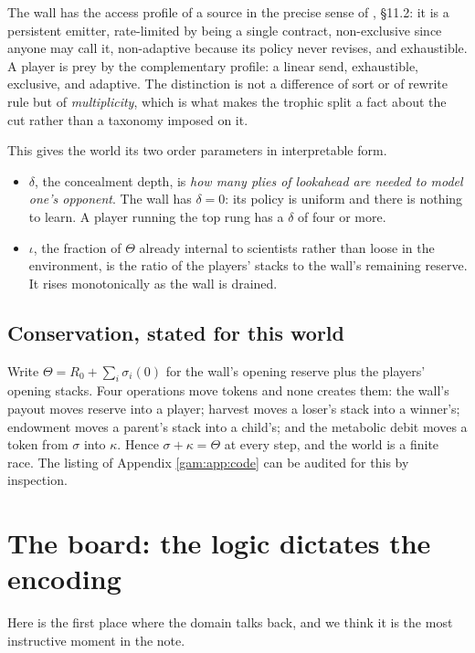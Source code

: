The wall has the access profile of a source in the precise sense of
\chSci, \S11.2: it is a persistent emitter, rate-limited by being a
single contract, non-exclusive since anyone may call it, non-adaptive because
its policy never revises, and exhaustible. A player is prey by the complementary
profile: a linear send, exhaustible, exclusive, and adaptive. The distinction is
not a difference of sort or of rewrite rule but of \emph{multiplicity}, which is
what makes the trophic split a fact about the cut rather than a taxonomy imposed
on it.

This gives the world its two order parameters in interpretable form.
\begin{itemize}
\item $\delta$, the concealment depth, is \emph{how many plies of lookahead are
needed to model one's opponent}. The wall has $\delta = 0$: its policy is
uniform and there is nothing to learn. A player running the top rung has a
$\delta$ of four or more.
\item $\iota$, the fraction of $\Theta$ already internal to scientists rather
than loose in the environment, is the ratio of the players' stacks to the wall's
remaining reserve. It rises monotonically as the wall is drained.
\end{itemize}

\subsection{Conservation, stated for this world}\label{gam:S3.3}

Write $\Theta = R_0 + \sum_i \sigma_i(0)$ for the wall's opening reserve plus
the players' opening stacks. Four operations move tokens and none creates them:
the wall's payout moves reserve into a player; harvest moves a loser's stack
into a winner's; endowment moves a parent's stack into a child's; and the
metabolic debit moves a token from $\sigma$ into $\kappa$. Hence $\sigma+\kappa
= \Theta$ at every step, and the world is a finite race. The listing of Appendix
\ref{gam:app:code} can be audited for this by inspection.

\section{The board: the logic dictates the encoding}\label{gam:sec:board}\label{gam:S4}

Here is the first place where the domain talks back, and we think it is the most
instructive moment in the note.

